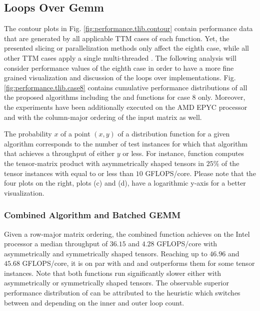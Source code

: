 
\subsection{Loops Over Gemm}
The contour plots in Fig. \ref{fig:performance.tlib.contour} contain performance data that are generated by all applicable TTM cases of each  function.
Yet, the presented slicing or parallelization methods only affect the eighth case, while all other TTM cases apply a single multi-threaded .
The following analysis will consider performance values of the eighth case in order to have a more fine grained visualization and discussion of the loops over  implementations.
Fig. \ref{fig:performance.tlib.case8} contains cumulative performance distributions of all the proposed algorithms including the   and  functions for case 8 only.
Moreover, the experiments have been additionally executed on the AMD EPYC processor and with the column-major ordering of the input matrix as well.

The probability $x$ of a point $(x,y)$ of a distribution function for a given algorithm corresponds to the number of test instances for which that algorithm that achieves a throughput of either $y$ or less.
For instance, function  computes the tensor-matrix product with asymmetrically shaped tensors in $25$\% of the tensor instances with equal to or less than $10$ GFLOPS/core.
Please note that the four plots on the right, plots (c) and (d), have a logarithmic y-axis for a better visualization.


\subsubsection{Combined Algorithm and Batched GEMM}
Given a row-major matrix ordering, the combined function  achieves on the Intel processor a median throughput of $36.15$ and $4.28$ GFLOPS/core with asymmetrically and symmetrically shaped tensors.
Reaching up to $46.96$ and $45.68$ GFLOPS/core, it is on par with  and  and outperforms them for some tensor instances.
Note that both functions run significantly slower either with asymmetrically or symmetrically shaped tensors.
The observable superior performance distribution of  can be attributed to the heuristic which switches between  and  depending on the inner and outer loop count.

